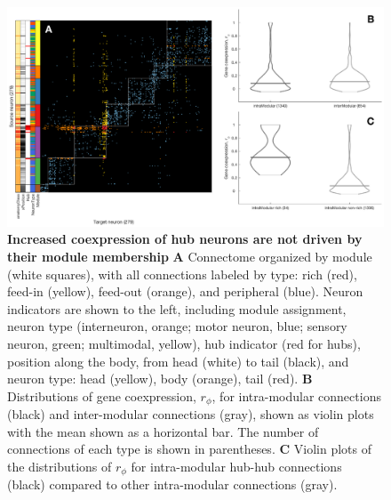 \documentclass[10pt,letterpaper]{article}
\begin{document}
\begin{figure}[!h]
\centering
    \includegraphics[width=1.2\textwidth]{Modules.eps}
 \caption{
 \textbf{Increased coexpression of hub neurons are not driven by their module membership}
\textbf{A} Connectome organized by module (white squares), with all connections labeled by type: rich (red), feed-in (yellow), feed-out (orange), and peripheral (blue).
Neuron indicators are shown to the left, including module assignment, neuron type (interneuron, orange; motor neuron, blue; sensory neuron, green; multimodal, yellow), hub indicator (red for hubs), position along the body, from head (white) to tail (black), and neuron type: head (yellow), body (orange), tail (red).
\textbf{B} Distributions of gene coexpression, $r_\phi$, for intra-modular connections (black) and inter-modular connections (gray), shown as violin plots with the mean shown as a horizontal bar.
The number of connections of each type is shown in parentheses.
\textbf{C} Violin plots of the distributions of $r_\phi$ for intra-modular hub-hub connections (black) compared to other intra-modular connections (gray).
}
\end{figure}
\end{document}

